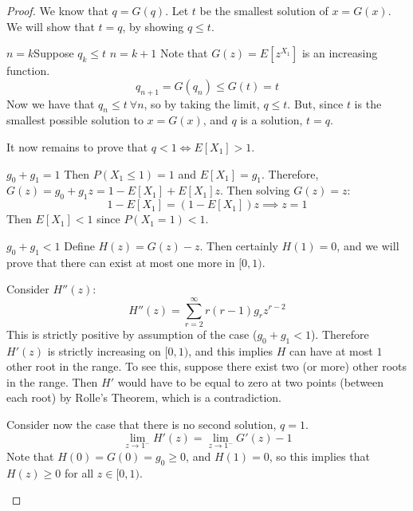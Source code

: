 \documentclass[../Main.tex]{subfiles}
\begin{document}
\begin{proof}
    We know that $q = G(q)$. Let $t$ be the smallest solution of $x = G(x)$. We will show that $t = q$, by showing $q \leq t$.\par
    {$n = k$}{Suppose $q_k \leq t$}
    {$n = k + 1$}{
        Note that $G(z) = E[z^{X_1}]$ is an increasing function.
        \begin{equation*}
            q_{n + 1} = G(q_n) \leq G(t) = t
        \end{equation*}
    }
    Now we have that $q_n \leq t~\forall n$, so by taking the limit, $q \leq t$. But, since $t$ is the smallest possible solution to $x = G(x)$, and $q$ is a solution, $t = q$.\par
    It now remains to prove that $q < 1 \Leftrightarrow E[X_1] > 1$.
    \begin{case}{$g_0 + g_1 = 1$}
        Then $P(X_1 \leq 1) = 1$ and $E[X_1] = g_1$. Therefore, $G(z) = g_0 + g_1 z = 1 - E[X_1] + E[X_1] z$. Then solving $G(z) = z$:
        \begin{equation*}
            1 - E[X_1] = \left(1 - E[X_1]\right)z \implies z = 1
        \end{equation*}
        Then $E[X_1] < 1$ since $P(X_1 = 1) < 1$.
    \end{case}
    \begin{case}{$g_0 + g_1 < 1$}
        Define $H(z) = G(z) - z$. Then certainly $H(1) = 0$, and we will prove that there can exist at most one more in $[0, 1)$.\par
        Consider $H''(z)$:
        \begin{equation*}
            H''(z) = \sum_{r=2}^\infty r(r-1) g_r z^{r-2}
        \end{equation*}
        This is strictly positive by assumption of the case ($g_0 + g_1 < 1$). Therefore $H'(z)$ is strictly increasing on $[0, 1)$, and this implies $H$ can have at most $1$ other root in the range. To see this, suppose there exist two (or more) other roots in the range. Then $H'$ would have to be equal to zero at two points (between each root) by Rolle's Theorem, which is a contradiction.\par
        Consider now the case that there is no second solution, $q = 1$.
        \begin{equation*}
            \lim_{z \to 1^-} H'(z) = \lim_{z \to 1^-} G'(z) - 1
        \end{equation*}
        Note that $H(0) = G(0) = g_0 \geq 0$, and $H(1) = 0$, so this implies that $H(z) \geq 0$ for all $z \in [0, 1)$.\par

\end{case}
\end{proof}
\end{document}
